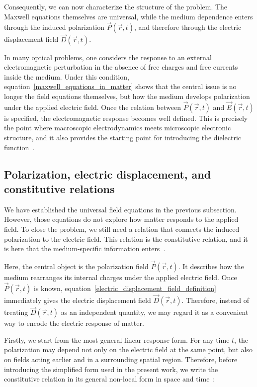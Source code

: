 Consequently, we can now characterize the structure of the problem.
The Maxwell equations themselves are universal,
while the medium dependence enters through the induced polarization $\vec{P}(\vec{r},t)$, and therefore through the electric displacement field $\vec{D}(\vec{r},t)$.

In many optical problems, one considers the response to an external electromagnetic perturbation in the absence of free charges and free currents inside the medium.
Under this condition, equation~\eqref{maxwell_equations_in_matter} shows that the central issue is no longer the field equations themselves,
but how the medium develops polarization under the applied electric field.
Once the relation between $\vec{P}(\vec{r},t)$ and $\vec{E}(\vec{r},t)$ is specified, the electromagnetic response becomes well defined.
This is precisely the point where macroscopic electrodynamics meets microscopic electronic structure,
and it also provides the starting point for introducing the dielectric function~\cite{landau2013electrodynamics,lima2022usefulness,bernasconi2011first}.

\FloatBarrier
\subsection{Polarization, electric displacement, and constitutive relations}

We have established the universal field equations in the previous subsection.
However, those equations do not explore how matter responds to the applied field.
To close the problem, we still need a relation that connects the induced polarization to the electric field.
This relation is the constitutive relation, and it is here that the medium-specific information enters~\cite{landau2013electrodynamics, lima2022usefulness}.

Here, the central object is the polarization field $\vec{P}(\vec{r},t)$.
It describes how the medium rearranges its internal charges under the applied electric field.
Once $\vec{P}(\vec{r},t)$ is known, equation~\eqref{electric_displacement_field_definition} immediately gives the electric displacement field $\vec{D}(\vec{r},t)$.
Therefore, instead of treating $\vec{D}(\vec{r},t)$ as an independent quantity, we may regard it as a convenient way to encode the electric response of matter.

Firstly, we start from the most general linear-response form.
For any time $t$, the polarization may depend not only on the electric field at the same point,
but also on fields acting earlier and in a surrounding spatial region.
Therefore, before introducing the simplified form used in the present work,
we write the constitutive relation in its general non-local form in space and time~\cite{royo2019first}:

